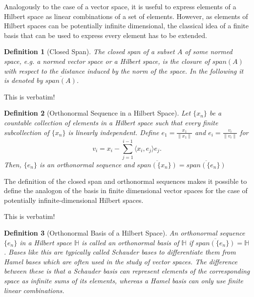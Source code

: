 \documentclass[12pt, a4paper]{article}
\theoremstyle{MAstyle} \newtheorem{assumption}{Assumption}[section]
\theoremstyle{MAstyle} \newtheorem{definition}{Definition}[section]
\theoremstyle{MAstyle} \newtheorem{theorem}{Theorem}[section]
\begin{document}
			Analogously to the case of a vector space, it is useful to express elements of a Hilbert space as linear combinations of a set of elements. However, as elements of Hilbert spaces can be potentially infinite dimensional, the classical idea of a finite basis that can be used to express every element has to be extended.
		
			\begin{definition}[Closed Span]
				The closed span of a subset $A$ of some normed space, e.g. a normed vector space or a Hilbert space, is the closure of $\textit{span}\left(A\right)$ with respect to the distance induced by the norm of the space. In the following it is denoted by $\overline{{\textit{span}\left(A\right)}}$.
			\end{definition}
		
			{\color{red} This is verbatim!}
			\begin{definition}[Orthonormal Sequence in a Hilbert Space]
				Let $\{x_n\}$ be a countable collection of elements in a Hilbert space such that every finite subcollection of $\{x_n\}$ is linearly independent. Define $e_1 = \frac{x_1}{\| x_1 \|}$ and $e_i = \frac{v_i}{\| v_i \|}$ for 
				$$v_i = x_i - \sum_{j = 1}^{i - 1}\langle x_i, e_j\rangle e_j.$$
				Then, $\{e_n\}$ is an orthonormal sequence and $\overline{{\textit{span}\left(\{x_n\}\right)}} = \overline{{\textit{span}\left(\{e_n\}\right)}}$
			\end{definition}
		
			The definition of the closed span and orthonormal sequences makes it possible to define the analogon of the basis in finite dimensional vector spaces for the case of potentially infinite-dimensional Hilbert spaces.
		
			{\color{red} This is verbatim!}
			\begin{definition}[Orthonormal Basis of a Hilbert Space]
				An orthonormal sequence $\{e_n\}$ in a Hilbert space $\mathbb{H}$ is called an orthonormal basis of $\mathbb{H}$ if $\overline{{\textit{span}\left(\{e_n\}\right)}} = \mathbb{H}$. Bases like this are typically called Schauder bases to differentiate them from Hamel bases which are often used in the study of vector spaces. The difference between these is that a Schauder basis can represent elements of the corresponding space as infinite sums of its elements, whereas a Hamel basis can only use finite linear combinations.
			\end{definition}
			
\end{document}
